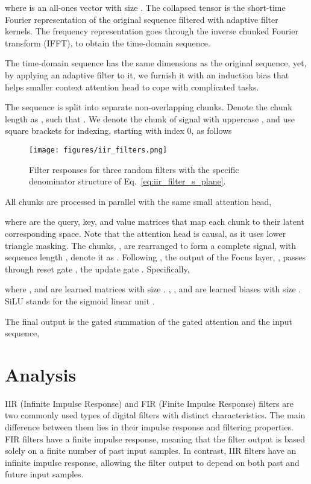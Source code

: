 \documentclass[11pt]{article}
\begin{document}
where  is an all-ones vector with size .
The collapsed tensor is the short-time Fourier representation of the original sequence filtered with adaptive filter kernels. The frequency representation goes through the inverse chunked Fourier transform (IFFT), to obtain the time-domain sequence.

The time-domain sequence has the same dimensions as the original sequence, yet, by applying an adaptive filter to it, we furnish it with an induction bias that helps smaller context attention head to cope with complicated tasks.

The sequence is split into  separate non-overlapping chunks. Denote the chunk length as , such that .
We denote the chunk of signal with uppercase , and use square brackets for indexing, starting with index 0, as follows



\begin{figure}
    \centering
    \texttt{[image: figures/iir\_filters.png]}
    \caption{Filter responses for three random filters with the specific denominator structure of Eq.~\ref{eq:iir_filter_s_plane}.}
    \label{fig:random_iir}
\end{figure}

All chunks are processed in parallel with the same small attention head,

where  are the query, key, and value matrices that map each chunk to their latent corresponding space.
Note that the attention head is causal, as it uses lower triangle masking.
The chunks, , are rearranged to form a complete signal, with sequence length , denote it as .
Following \cite{ma2022mega}, the output of the Focus layer, , passes through reset gate , the update gate . Specifically,



where ,  and  are learned matrices with size . , , and  are learned biases with size . SiLU stands for the 
sigmoid linear unit \cite{elfwing2018sigmoid}.

The final output is the gated summation of the gated attention and the input sequence,


\section{Analysis}
\label{seq:analysis}
{}
IIR (Infinite Impulse Response) and FIR (Finite Impulse Response) filters are two commonly used types of digital filters with distinct characteristics. The main difference between them lies in their impulse response and filtering properties. FIR filters have a finite impulse response, meaning that the filter output is based solely on a finite number of past input samples. In contrast, IIR filters have an infinite impulse response, allowing the filter output to depend on both past and future input samples.
\end{document}
